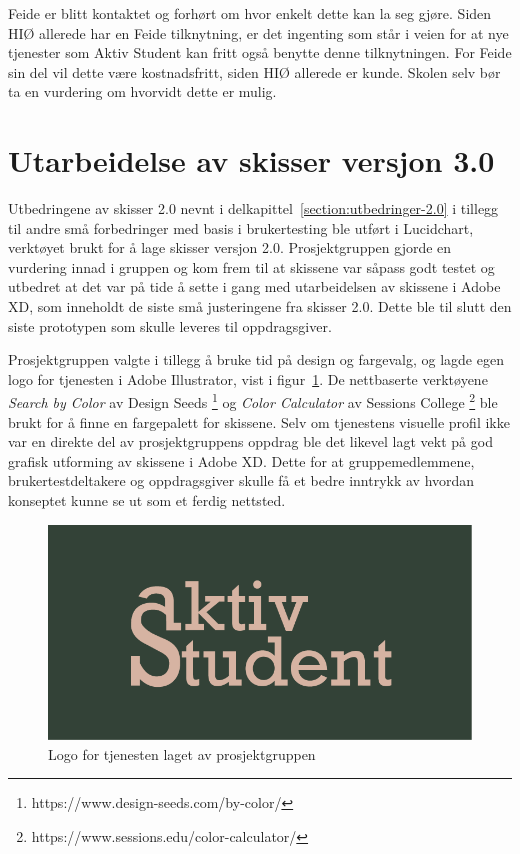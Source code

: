 Feide er blitt kontaktet og forhørt om hvor enkelt dette kan la seg gjøre. Siden HIØ allerede har en Feide tilknytning, er det ingenting som står i veien for at nye tjenester som Aktiv Student kan fritt også benytte denne tilknytningen. For Feide sin del vil dette være kostnadsfritt, siden HIØ allerede er kunde. Skolen selv bør ta en vurdering om hvorvidt dette er mulig.


\section{Utarbeidelse av skisser versjon 3.0}

Utbedringene av skisser 2.0 nevnt i delkapittel~\ref{section:utbedringer-2.0} i tillegg til andre små forbedringer med basis i brukertesting ble utført i Lucidchart, verktøyet brukt for å lage skisser versjon 2.0. Prosjektgruppen gjorde en vurdering innad i gruppen og kom frem til at skissene var såpass godt testet og utbedret at det var på tide å sette i gang med utarbeidelsen av skissene i Adobe XD, som inneholdt de siste små justeringene fra skisser 2.0. Dette ble til slutt den siste prototypen som skulle leveres til oppdragsgiver.

Prosjektgruppen valgte i tillegg å bruke tid på design og fargevalg, og lagde egen logo for tjenesten i Adobe Illustrator, vist i figur~\ref{fig:aktivStudentLogo}. De nettbaserte verktøyene {\em  Search by Color} av Design Seeds \footnote{https://www.design-seeds.com/by-color/} og {\em  Color Calculator} av Sessions College \footnote{https://www.sessions.edu/color-calculator/} ble brukt for å finne en fargepalett for skissene. Selv om tjenestens visuelle profil ikke var en direkte del av prosjektgruppens oppdrag ble det likevel lagt vekt på god grafisk utforming av skissene i Adobe XD. Dette for at gruppemedlemmene, brukertestdeltakere og oppdragsgiver skulle få et bedre inntrykk av hvordan konseptet kunne se ut som et ferdig nettsted.

\begin{figure}[H]
\centering
\includegraphics[width=.7\textwidth]{Illustrasjoner/aktivstudentlogo.png}
\caption{Logo for tjenesten laget av prosjektgruppen}
\label{fig:aktivStudentLogo}
\end{figure}

